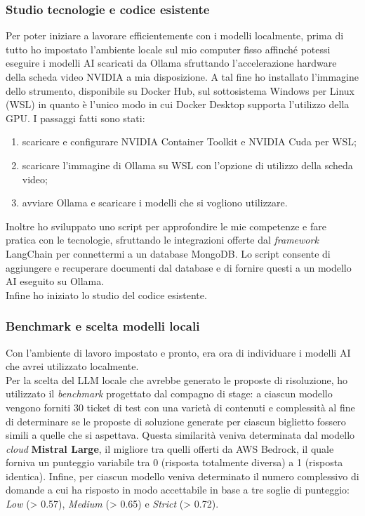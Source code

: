 \subsubsection*{Studio tecnologie e codice esistente}
Per poter iniziare a lavorare efficientemente con i modelli localmente, prima di tutto ho 
impostato l'ambiente locale sul mio computer fisso affinché potessi eseguire i modelli AI scaricati da Ollama sfruttando l'accelerazione hardware della scheda video NVIDIA a mia disposizione. 
A tal fine ho installato l'immagine dello strumento, disponibile su Docker Hub, sul sottosistema Windows per Linux (WSL) in quanto è l'unico modo in cui Docker Desktop supporta l'utilizzo della GPU.
I passaggi fatti sono stati:
\begin{enumerate}
    \item scaricare e configurare NVIDIA Container Toolkit e NVIDIA Cuda per WSL;
    \item scaricare l'immagine di Ollama su WSL con l'opzione di utilizzo della scheda video;
    \item avviare Ollama e scaricare i modelli che si vogliono utilizzare.
\end{enumerate}
Inoltre ho sviluppato uno script per approfondire le mie competenze e fare pratica con le tecnologie, sfruttando le integrazioni offerte dal \textit{framework} LangChain per connettermi a un database MongoDB.
Lo script consente di aggiungere e recuperare documenti dal database e di fornire questi a un modello AI eseguito su Ollama.\\
Infine ho iniziato lo studio del codice esistente.

\subsubsection*{Benchmark e scelta modelli locali}
\label{sec:choosing_local_models}

Con l'ambiente di lavoro impostato e pronto, era ora di individuare i modelli AI che avrei utilizzato localmente.\\

Per la scelta del LLM locale che avrebbe generato le proposte di risoluzione, ho 
utilizzato il \textit{benchmark} progettato dal compagno di stage: a ciascun modello vengono forniti 30 ticket di test con una varietà di contenuti e complessità al fine di determinare se le proposte di soluzione generate per ciascun biglietto fossero simili a quelle che si aspettava. 
Questa similarità veniva determinata dal modello \textit{cloud} \textbf{Mistral Large}, il migliore tra quelli offerti da AWS Bedrock, il quale forniva un punteggio variabile tra 0 (risposta totalmente diversa) a 1 (risposta identica). Infine, per ciascun modello veniva determinato il numero complessivo di domande a cui ha risposto in modo accettabile in base a tre soglie di punteggio: \textit{Low} (> 0.57), \textit{Medium} (> 0.65) e \textit{Strict} (> 0.72).

